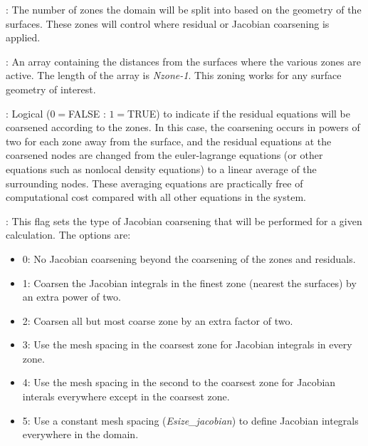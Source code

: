 \documentclass[10pt,onecolumn]{article}
\begin{document}

\vspace{0.1in}
:  The number of zones the domain will be
split into based on the geometry of the surfaces.  These zones
will control where residual or Jacobian coarsening is applied.

\vspace{0.1in}
:  An array containing the distances from the surfaces
where the various zones are active.  The length of the array is
{\it Nzone-1}.  This zoning works for any surface geometry of
interest.

\vspace{0.1in}
:  Logical ($0=$FALSE : $1=$TRUE) to indicate
if the residual equations will be coarsened according to the
zones.  In this case, the coarsening occurs in powers of two for
each zone away from the surface, and the residual equations at the
coarsened nodes are changed from the euler-lagrange equations (or
other equations such as nonlocal density equations) to a linear
average of the surrounding nodes.  These averaging equations are
practically free of computational cost compared with all other
equations in the system.


\vspace{0.1in}
:  This flag sets the type of Jacobian
coarsening that will be performed for a given calculation.  The
options are: 

\begin{itemize}
\item 0: No Jacobian coarsening beyond the coarsening of the
zones and residuals.

\item 1: Coarsen the Jacobian integrals in the finest zone (nearest
the surfaces) by an extra power of two.

\item 2: Coarsen all but most coarse zone by an extra factor
of two.

\item 3: Use the mesh spacing in the coarsest zone for
Jacobian integrals in every zone.

\item 4: Use the mesh spacing in the second to the coarsest
zone for Jacobian interals everywhere except in the coarsest zone.

\item 5:  Use a constant mesh spacing ({\it Esize\_jacobian})
to define Jacobian integrals everywhere in the domain.
\end{itemize}
\end{document}
